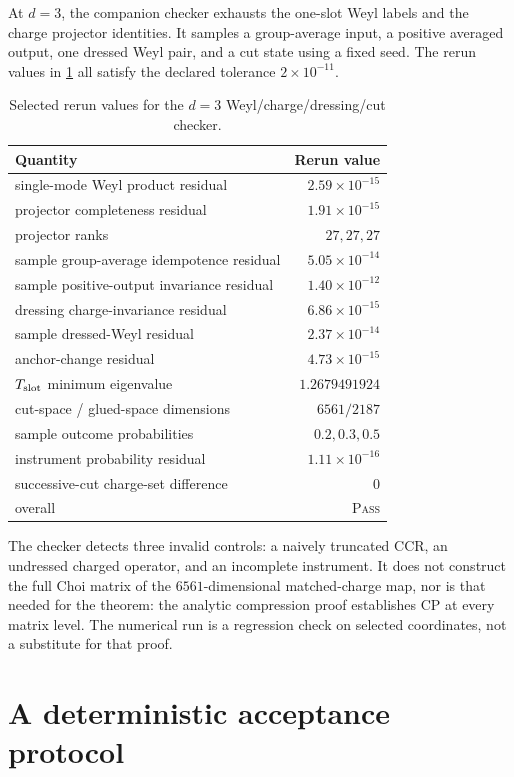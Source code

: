 \documentclass[11pt,a4paper]{article}
\theoremstyle{definition}
\theoremstyle{remark}
\newcommand{\status}[1]{\textsc{#1}}
\begin{document}
At $d=3$, the companion checker exhausts the one-slot Weyl labels and the charge
projector identities.  It samples a group-average input, a positive averaged output,
one dressed Weyl pair, and a cut state using a fixed seed.  The rerun values in
\cref{tab:ads-audit} all satisfy the declared tolerance $2\times10^{-11}$.

\begin{table}[t]
\centering
\caption{Selected rerun values for the $d=3$ Weyl/charge/dressing/cut checker.}
\label{tab:ads-audit}
\begin{tabular}{@{}lr@{}}
\toprule
Quantity & Rerun value\\
\midrule
single-mode Weyl product residual & $2.59\times10^{-15}$\\
projector completeness residual & $1.91\times10^{-15}$\\
projector ranks & $27,27,27$\\
sample group-average idempotence residual & $5.05\times10^{-14}$\\
sample positive-output invariance residual & $1.40\times10^{-12}$\\
dressing charge-invariance residual & $6.86\times10^{-15}$\\
sample dressed-Weyl residual & $2.37\times10^{-14}$\\
anchor-change residual & $4.73\times10^{-15}$\\
$T_{\rm slot}$ minimum eigenvalue & $1.2679491924$\\
cut-space / glued-space dimensions & $6561/2187$\\
sample outcome probabilities & $0.2,0.3,0.5$\\
instrument probability residual & $1.11\times10^{-16}$\\
successive-cut charge-set difference & $0$\\
overall & \status{Pass}\\
\bottomrule
\end{tabular}
\end{table}

The checker detects three invalid controls: a naively truncated CCR, an undressed
charged operator, and an incomplete instrument.  It does not construct the full Choi
matrix of the $6561$-dimensional matched-charge map, nor is that needed for the theorem: the analytic
compression proof establishes CP at every matrix level.  The numerical run is a
regression check on selected coordinates, not a substitute for that proof.

\section{A deterministic acceptance protocol}
\label{sec:protocol}
\end{document}
